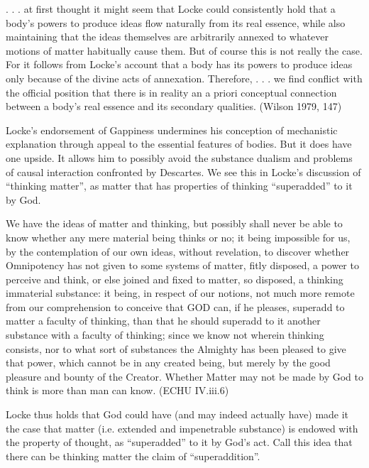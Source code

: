 \documentclass[12pt]{article}
\makeatletter
\newcommand{\citeprocitem}[2]{\hyper@linkstart{cite}{citeproc_bib_item_#1}#2\hyper@linkend}
\makeatother
\begin{document}
\begin{quote-b}
. . . at first thought it might seem that Locke could consistently hold that a body's
powers to produce ideas flow naturally from its real essence, while also maintaining
that the ideas themselves are arbitrarily annexed to whatever motions of matter
habitually cause them. But of course this is not really the case. For it follows from
Locke's account that a body has its powers to produce ideas only because of the
divine acts of annexation. Therefore, . . . we find conflict with the official
position that there is in reality an a priori conceptual connection between a body's
real essence and its secondary qualities. (\citeprocitem{7}{Wilson 1979, 147})
\end{quote-b}

Locke's endorsement of Gappiness undermines his conception of mechanistic explanation
through appeal to the essential features of bodies. But it does have one upside. It
allows him to possibly avoid the substance dualism and problems of causal interaction
confronted by Descartes. We see this in Locke's discussion of ``thinking matter'', as
matter that has properties of thinking ``superadded'' to it by God.

\begin{quote-b}
We have the ideas of matter and thinking, but possibly shall never be able to know
whether any mere material being thinks or no; it being impossible for us, by the
contemplation of our own ideas, without revelation, to discover whether Omnipotency
has not given to some systems of matter, fitly disposed, a power to perceive and
think, or else joined and fixed to matter, so disposed, a thinking immaterial
substance: it being, in respect of our notions, not much more remote from our
comprehension to conceive that GOD can, if he pleases, superadd to matter a faculty
of thinking, than that he should superadd to it another substance with a faculty of
thinking; since we know not wherein thinking consists, nor to what sort of substances
the Almighty has been pleased to give that power, which cannot be in any created
being, but merely by the good pleasure and bounty of the Creator. Whether Matter may
not be made by God to think is more than man can know. (ECHU IV.iii.6)
\end{quote-b}

Locke thus holds that God could have (and may indeed actually have) made it the
case that matter (i.e. extended and impenetrable substance) is endowed with the
property of thought, as ``superadded'' to it by God's act. Call this idea that
there can be thinking matter the claim of ``superaddition''.
\end{document}
